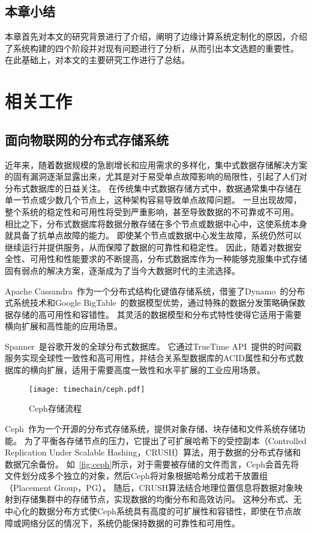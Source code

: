 \section{本章小结}
本章首先对本文的研究背景进行了介绍，阐明了边缘计算系统定制化的原因，介绍了系统构建的四个阶段并对现有问题进行了分析，从而引出本文选题的重要性。
在此基础上，对本文的主要研究工作进行了总结。

\chapter{相关工作}
\section{面向物联网的分布式存储系统}
近年来，随着数据规模的急剧增长和应用需求的多样化，集中式数据存储解决方案的固有漏洞逐渐显露出来，尤其是对于易受单点故障影响的局限性，引起了人们对分布式数据库的日益关注。
在传统集中式数据存储方式中，数据通常集中存储在单一节点或少数几个节点上，这种架构容易导致单点故障问题。
一旦出现故障，整个系统的稳定性和可用性将受到严重影响，甚至导致数据的不可靠或不可用。
相比之下，分布式数据库将数据分散存储在多个节点或数据中心中，这使系统本身就具备了抗单点故障的能力。
即使某个节点或数据中心发生故障，系统仍然可以继续运行并提供服务，从而保障了数据的可靠性和稳定性。
因此，随着对数据安全性、可用性和性能要求的不断提高，分布式数据库作为一种能够克服集中式存储固有弱点的解决方案，逐渐成为了当今大数据时代的主流选择。

Apache Cassandra~\cite{lakshman2010cassandra}作为一个分布式结构化键值存储系统，借鉴了Dynamo~\cite{decandia2007dynamo}的分布式系统技术和Google BigTable~\cite{chang2008bigtable}的数据模型优势，通过特殊的数据分发策略确保数据存储的高可用性和容错性。
其灵活的数据模型和分布式特性使得它适用于需要横向扩展和高性能的应用场景。

Spanner~\cite{corbett2013spanner}是谷歌开发的全球分布式数据库。
它通过TrueTime API~\cite{cervin2016truetime}提供的时间戳服务实现全球性一致性和高可用性，并结合关系型数据库的ACID属性和分布式数据库的横向扩展，适用于需要高度一致性和水平扩展的工业应用场景。

\begin{figure}[t]
    \centering
    \texttt{[image: timechain/ceph.pdf]}
    \caption{Ceph存储流程}
    \label{fig:ceph}
\end{figure}

Ceph~\cite{weil2006ceph}作为一个开源的分布式存储系统，提供对象存储、块存储和文件系统存储功能。
为了平衡各存储节点的压力，它提出了可扩展哈希下的受控副本（Controlled Replication Under Scalable Hashing，CRUSH）算法，用于数据的分布式存储和数据冗余备份。
如~\autoref{fig:ceph}所示，对于需要被存储的文件而言，Ceph会首先将文件划分成多个独立的对象，然后Ceph将对象根据哈希分成若干放置组（Placement Group，PG）。
随后，CRUSH算法结合地理位置信息将数据对象映射到存储集群中的存储节点，实现数据的均衡分布和高效访问。
这种分布式、无中心化的数据分布方式使Ceph系统具有高度的可扩展性和容错性，即使在节点故障或网络分区的情况下，系统仍能保持数据的可靠性和可用性。

